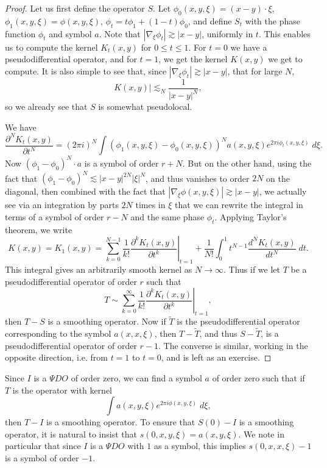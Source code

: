 \begin{proof}
    Let us first define the operator $S$. Let $\phi_0(x,y,\xi) = (x - y) \cdot \xi$, $\phi_1(x,y,\xi) = \phi(x,y,\xi)$, $\phi_t = t \phi_1 + (1 - t) \phi_0$, and define $S_t$ with the phase function $\phi_t$ and symbol $a$. Note that $|\nabla_\xi \phi_t| \gtrsim |x - y|$, uniformly in $t$. This enables us to compute the kernel $K_t(x,y)$ for $0 \leq t \leq 1$. For $t = 0$ we have a pseudodifferential operator, and for $t = 1$, we get the kernel $K(x,y)$ we get to compute. It is also simple to see that, since $|\nabla_\xi \phi_t| \gtrsim |x - y|$, that for large $N$,
    \[ K(x,y)| \lesssim_N \frac{1}{|x - y|^N}, \]
    so we already see that $S$ is somewhat pseudolocal.

    We have
    \[ \frac{\partial^N K_t(x,y)}{\partial t^N} = (2 \pi i)^N \int (\phi_1(x,y,\xi) - \phi_0(x,y,\xi))^N a(x,y,\xi) e^{2 \pi i \phi_t(x,y,\xi)}\; d\xi. \]
    Now $(\phi_1 - \phi_0)^N \cdot a$ is a symbol of order $r + N$. But on the other hand, using the fact that $(\phi_1 - \phi_0)^N \lesssim |x - y|^{2N} |\xi|^N$, and thus vanishes to order $2N$ on the diagonal, then combined with the fact that $|\nabla_\xi \phi(x,y,\xi)| \gtrsim |x - y|$, we actually see via an integration by parts $2N$ times in $\xi$ that we can rewrite the integral in terms of a symbol of order $r - N$ and the same phase $\phi_t$. Applying Taylor's theorem, we write
    \[ K(x,y) = K_1(x,y) = \sum_{k = 0}^{N-1} \frac{1}{k!} \left. \frac{\partial^k K_t(x,y)}{\partial t^k} \right|_{t = 1} + \frac{1}{N!} \int_0^1 t^{N-1} \frac{d^NK_t(x,y)}{dt^N}\; dt. \]
    This integral gives an arbitrarily smooth kernel as $N \to \infty$. Thus if we let $T$ be a pseudodifferential operator of order $r$ such that
    \[ T \sim \sum_{k = 0}^\infty \frac{1}{k!} \left. \frac{\partial^k K_t(x,y)}{\partial t^k} \right|_{t = 1}, \]
    then $T - S$ is a smoothing operator. Now if $\tilde{T}$ is the pseudodifferential operator corresponding to the symbol $a(x,x,\xi)$, then $T - \tilde{T}$, and thus $S - \tilde{T}$, is a pseudodifferential operator of order $r-1$. The converse is similar, working in the opposite direction, i.e. from $t = 1$ to $t = 0$, and is left as an exercise.
\end{proof}

Since $I$ is a $\Psi DO$ of order zero, we can find a symbol $a$ of order zero such that if $T$ is the operator with kernel
%
\[ \int a(x,y,\xi) e^{2 \pi i \phi(x,y,\xi)}\; d\xi, \]
%
then $T - I$ is a smoothing operator. To ensure that $S(0) - I$ is a smoothing operator, it is natural to insist that $s(0,x,y,\xi) = a(x,y,\xi)$. We note in particular that since $I$ is a $\Psi DO$ with $1$ as a symbol, this implies $s(0,x,x,\xi) - 1$ is a symbol of order $-1$.

